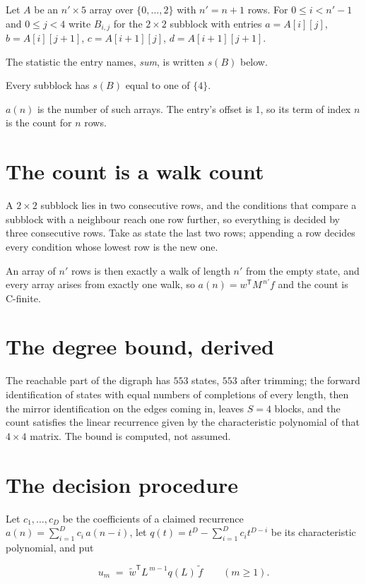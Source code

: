 \documentclass[11pt]{article}
\theoremstyle{definition}
\begin{document}
Let $A$ be an $n' \times 5$ array over $\{0,\dots,2\}$ with $n' = n + 1$ rows. For $0 \le i < n'-1$ and $0 \le j < 4$ write $B_{i,j}$ for the $2\times2$ subblock with entries $a = A[i][j]$, $b = A[i][j{+}1]$, $c = A[i{+}1][j]$, $d = A[i{+}1][j{+}1]$.

The statistic the entry names, {\itshape sum}, is written $s(B)$ below.

Every subblock has $s(B)$ equal to one of $\{4\}$.

$a(n)$ is the number of such arrays. The entry's offset is 1, so its term of index $n$ is the count for $n$ rows.

\section{The count is a walk count}

A $2\times2$ subblock lies in two consecutive rows, and the conditions that compare a subblock with a neighbour reach one row further, so everything is decided by three consecutive rows. Take as state the last two rows; appending a row decides every condition whose lowest row is the new one.

An array of $n'$ rows is then exactly a walk of length $n'$ from the empty state, and every array arises from exactly one walk, so $a(n) = w^{\mathsf T}M^{\,n'}f$ and the count is C-finite.

\section{The degree bound, derived}

The reachable part of the digraph has $553$ states, $553$ after trimming; the forward identification of states with equal numbers of completions of every length, then the mirror identification on the edges coming in, leaves $S = 4$ blocks, and the count satisfies the linear recurrence given by the characteristic polynomial of that $4\times4$ matrix. The bound is computed, not assumed.

\section{The decision procedure}

Let $c_1,\dots,c_D$ be the coefficients of a claimed recurrence $a(n) = \sum_{i=1}^{D} c_i\,a(n-i)$, let $q(t) = t^{D} - \sum_{i=1}^{D} c_i t^{D-i}$ be its characteristic polynomial, and put

\[u_m \;=\; \tilde w^{\mathsf T} L^{\,m-1} q(L)\,\tilde f \qquad (m \ge 1).\]
\end{document}
